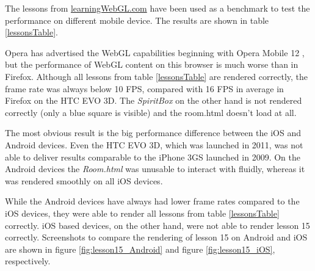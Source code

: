 \documentclass[12pt,journal,compsoc]{IEEEtran}
\begin{document}
The lessons from \url{learningWebGL.com} \cite{learningwebgl} have been used as a benchmark to test the performance on different mobile device. The results are shown in table \ref{lessonsTable}.

Opera has advertised the WebGL capabilities beginning with Opera Mobile 12 \cite{opera12}, but the performance of WebGL content on this browser is much worse than in Firefox. Although all lessons from table \ref{lessonsTable} are rendered correctly, the frame rate was always below 10 FPS, compared with 16 FPS in average in Firefox on the HTC EVO 3D. The \textit{SpiritBox} on the other hand is not rendered correctly (only a blue square is visible) and the room.html doesn’t load at all.

The most obvious result is the big performance difference between the iOS and Android devices. Even the HTC EVO 3D, which was launched in 2011, was not able to deliver results comparable to the iPhone 3GS launched in 2009. On the Android devices the \textit{Room.html} was unusable to interact with fluidly, whereas it was rendered smoothly on all iOS devices. 

While the Android devices have always had lower frame rates compared to the iOS devices, they were able to render all lessons from table \ref{lessonsTable} correctly. iOS based  devices, on the other hand, were not able to render lesson 15 correctly. Screenshots to compare the rendering of lesson 15 on Android and iOS are shown in figure \ref{fig:lesson15_Android} and figure \ref{fig:lesson15_iOS}, respectively. 
\end{document}
